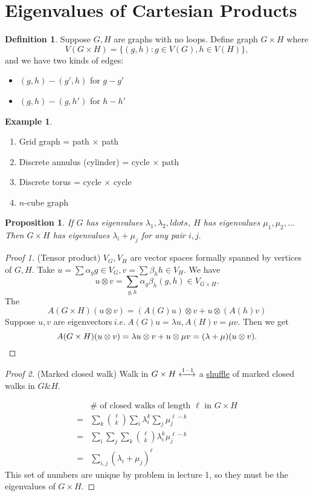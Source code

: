 \documentclass{report}
\newcommand{\ie}{\ i.e.\ }
\newtheorem{proposition}{Proposition}[section]
\theoremstyle{definition}
\newtheorem{definition}{Definition}[section]
\newtheorem{example}{Example}[section]
\theoremstyle{remark}
\numberwithin{equation}{section}
\begin{document}
\section{Eigenvalues of Cartesian Products}
\begin{definition}
Suppose $G, H$ are graphs with no loops. Define graph $G \times H$ where \[V(G \times H) = \{(g, h) : g \in V(G), h \in V(H)\},\]
and we have two kinds of edges:
\begin{itemize}
\item $(g, h) - (g', h)$ for $g - g'$
\item $(g, h) - (g, h')$ for $h - h'$
\end{itemize}
\end{definition}
\begin{example}
\begin{enumerate}
\item Grid graph = path $\times$ path
\item Discrete annulus
(cylinder) = cycle $\times$ path
\item Discrete torus = cycle $\times$ cycle
\item $n$-cube graph
\end{enumerate}
\end{example}
\begin{proposition}
If $G$ has eigenvalues $\lambda_1, \lambda_2, ldots$, $H$ has eigenvalues $\mu_1, \mu_2, \ldots$ Then $G \times H$ has eigenvalues $\lambda_i + \mu_j$ for any pair $i, j.$
\end{proposition}
\begin{proof}[Proof 1](Tensor product)
$V_G, V_H$ are vector spaces formally spanned by vertices of $G, H.$ Take $u = \sum \alpha_g g \in V_G, v = \sum \beta_h h \in V_H.$ We have
\[u \otimes v = \sum_{g, h} \alpha_g\beta_h(g, h) \in V_{G \times H}.\]
The 
\[
A(G \times H)(u \otimes v) = (A(G)u) \otimes v + u \otimes (A(h)v)
\]
Suppose $u, v$ are eigenvectors$\ie A(G)u = \lambda u, A(H)v = \mu v.$ Then we get
\[
A(G \times H)(u \otimes v) = \lambda u \otimes v + u \otimes \mu v = (\lambda+\mu)(u \otimes v). \qedhere
\]
\end{proof}

\begin{proof}[Proof 2](Marked closed walk)
Walk in $G \times H \xleftrightarrow[]{1-1}$ a \underline{shuffle} of marked closed walks in $G \& H.$

\begin{align*}
& \# \text{ of closed walks of length $\ell$ in $G \times H$} \\
= & \sum_{k} {\ell \choose k} \sum_i \lambda_i^k\sum_j \mu_j^{\ell - k} \\
= & \sum_i \sum_j \sum_k {\ell \choose k} \lambda_i^{k} \mu_j^{\ell - k} \\
= & \sum_{i, j} (\lambda_i + \mu_j)^\ell
\end{align*}
This set of numbers are unique by problem in lecture 1, so they must be the eigenvalues of $G \times H.$
\end{proof}
\end{document}
